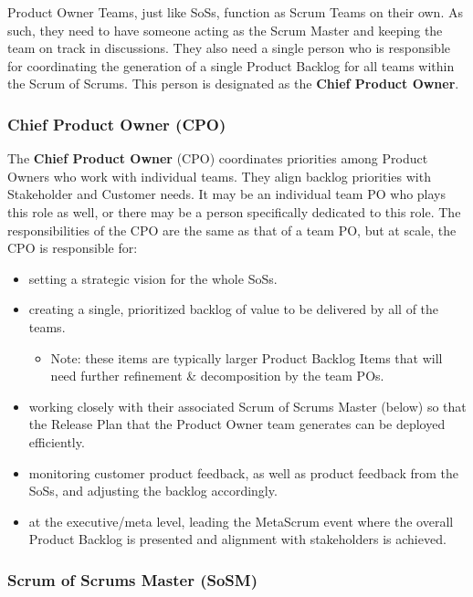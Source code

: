 \documentclass[12pt,a4paper,parskip=full]{scrartcl}
\begin{document}
Product Owner Teams, just like SoSs, function as Scrum Teams on their own. As such, they need to have someone acting as the Scrum Master and keeping the team on track in discussions. They also need a single person who is responsible for coordinating the generation of a single Product Backlog for all teams within the Scrum of Scrums. This person is designated as the \textbf{Chief Product Owner}.

\subsubsection{Chief Product Owner (CPO)}

The \textbf{Chief Product Owner} (CPO) coordinates priorities among Product Owners who work with individual teams. They align backlog priorities with Stakeholder and Customer needs. It may be an individual team PO who plays this role as well, or there may be a person specifically dedicated to this role. The responsibilities of the CPO are the same as that of a team PO, but at scale, the CPO is responsible for:

\begin{itemize}
	\item setting a strategic vision for the whole SoSs.
	\item creating a single, prioritized backlog of value to be delivered by all of the teams.
	\begin{itemize}
		\item Note: these items are typically larger Product Backlog Items that will need further refinement \& decomposition by the team POs.
	\end{itemize}
	\item working closely with their associated Scrum of Scrums Master (below) so that the Release Plan that the Product Owner team generates can be deployed efficiently.
	\item monitoring customer product feedback, as well as product feedback from the SoSs, and adjusting the backlog accordingly.
	\item at the executive/meta level, leading the MetaScrum event where the overall Product Backlog is presented and alignment with stakeholders is achieved.
\end{itemize}



\subsubsection{Scrum of Scrums Master (SoSM)}
\end{document}
